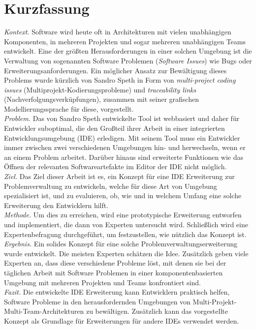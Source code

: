 \documentclass[
  a4paper,  %
  twoside,  %
  bibliography=totoc,
  headsepline,
  cleardoublepage=empty,
  parskip=half,
  draft=false
]{scrbook}
\begin{document}
\section*{Kurzfassung}
\textit{Kontext.} Software wird heute oft in Architekturen mit vielen unabhängigen Komponenten, in mehreren Projekten und sogar mehreren unabhängigen Teams entwickelt. 
Eine der größten Herausforderungen in einer solchen Umgebung ist die Verwaltung von sogenannten Software Problemen (\textit{Software Issues}) wie Bugs oder Erweiterungsanforderungen. 
Ein möglicher Ansatz zur Bewältigung dieses Problems wurde kürzlich von Sandro Speth in Form von \textit{multi-project coding issues} (Multiprojekt-Kodierungsprobleme) und \textit{traceability links} (Nachverfolgungsverküpfungen), zusammen mit seiner grafischen Modellierungssprache für diese, vorgestellt. \\
\textit{Problem.} Das von Sandro Speth entwickelte Tool ist webbasiert und daher für Entwickler suboptimal, 
die den Großteil ihrer Arbeit in einer integrierten Entwicklungsumgebung (IDE) erledigen. 
Mit seinem Tool muss ein Entwickler immer zwischen zwei verschiedenen Umgebungen hin- und herwechseln, wenn er an einem Problem arbeitet. 
Darüber hinaus sind erweiterte Funktionen wie das Öffnen der relevanten Softwareartefakte im Editor der IDE nicht möglich. \\
\textit{Ziel.} Das Ziel dieser Arbeit ist es, ein Konzept für eine IDE Erweiterung zur Problemverwaltung zu entwickeln, welche für diese Art von Umgebung spezialisiert ist, und zu evaluieren, ob, wie und in welchem Umfang eine solche Erweiterung den Entwicklern hilft. \\
\textit{Methode.} Um dies zu erreichen, wird eine prototypische Erweiterung entworfen und implementiert, die dann von Experten untersucht wird.
Schließlich wird eine Expertenbefragung durchgeführt, um festzustellen, wie nützlich das Konzept ist. \\
\textit{Ergebnis.} Ein solides Konzept für eine solche Problemverwaltungserweiterung wurde entwickelt. 
Die meisten Experten schätzen die Idee. Zusätzlich geben viele Experten an, dass diese verschiedene Probleme löst, mit denen sie bei der täglichen Arbeit mit Software Problemen in einer komponentenbasierten Umgebung mit mehreren Projekten und Teams konfrontiert sind.\\
\textit{Fazit.} Die entwickelte \gls{IDE} Erweiterung kann Entwicklern praktisch helfen, Software Probleme in den herausfordernden Umgebungen von Multi-Projekt-Multi-Team-Architekturen zu bewältigen. Zusätzlich kann das vorgestellte Konzept als Grundlage für Erweiterungen für andere IDEs verwendet werden.
\cleardoublepage
\end{document}
